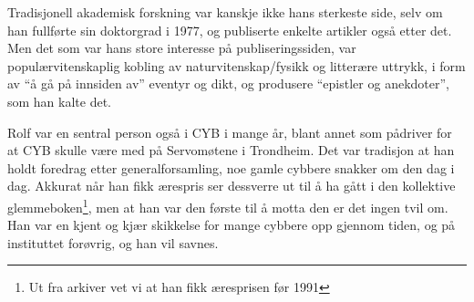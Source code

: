 Tradisjonell akademisk forskning var kanskje ikke hans sterkeste side, selv om han fullførte sin doktorgrad i 1977, og publiserte enkelte artikler også etter det. Men det som var hans store interesse på publiseringssiden, var populærvitenskaplig kobling av naturvitenskap\slash fysikk og litterære uttrykk, i form av ``å gå på innsiden av'' eventyr og dikt, og produsere ``epistler og anekdoter'', som han kalte det.

Rolf var en sentral person også i CYB i mange år, blant annet som pådriver for at CYB skulle være med på Servomøtene i Trondheim. Det var tradisjon at han holdt foredrag etter generalforsamling, noe gamle cybbere snakker om den dag i dag. Akkurat når han fikk ærespris ser dessverre ut til å ha gått i den kollektive glemmeboken\footnote{Ut fra arkiver vet vi at han fikk æresprisen før 1991}, men at han var den første til å motta den er det ingen tvil om. Han var en kjent og kjær skikkelse for mange cybbere opp gjennom tiden, og på instituttet forøvrig, og han vil savnes.

